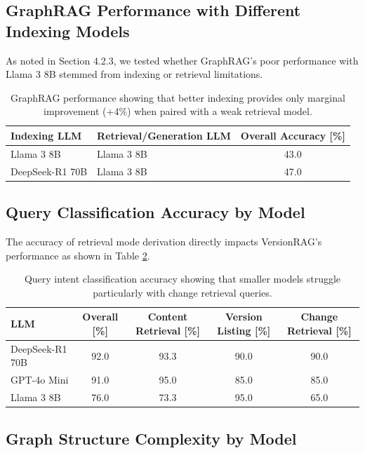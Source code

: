 \subsection{GraphRAG Performance with Different Indexing Models}

As noted in Section 4.2.3, we tested whether GraphRAG's poor performance with Llama 3 8B stemmed from indexing or retrieval limitations.

\begin{table}[h]
\centering
\small
\caption{GraphRAG performance showing that better indexing provides only marginal improvement (+4\%) when paired with a weak retrieval model.}
\begin{tabular}{llc}
\hline
Indexing LLM & Retrieval/Generation LLM & Overall Accuracy [\%] \\ \hline
Llama 3 8B & Llama 3 8B & 43.0 \\
DeepSeek-R1 70B & Llama 3 8B & 47.0 \\ \hline
\end{tabular}
\label{tab:graphrag_different_indexing_models}
\end{table}

\newpage

\subsection{Query Classification Accuracy by Model}

The accuracy of retrieval mode derivation directly impacts VersionRAG's performance as shown in Table \ref{tab:query_classification_accuracy_by_model}.

\begin{table}[h]
\centering
\small
\caption{Query intent classification accuracy showing that smaller models struggle particularly with change retrieval queries.}
\begin{tabular}{lcccc}
\hline
LLM & Overall [\%] & Content Retrieval [\%] & Version Listing [\%] & Change Retrieval [\%] \\ \hline
DeepSeek-R1 70B & 92.0 & 93.3 & 90.0 & 90.0 \\
GPT-4o Mini & 91.0 & 95.0 & 85.0 & 85.0 \\
Llama 3 8B & 76.0 & 73.3 & 95.0 & 65.0 \\ \hline
\end{tabular}
\label{tab:query_classification_accuracy_by_model}
\end{table}

\subsection{Graph Structure Complexity by Model}

